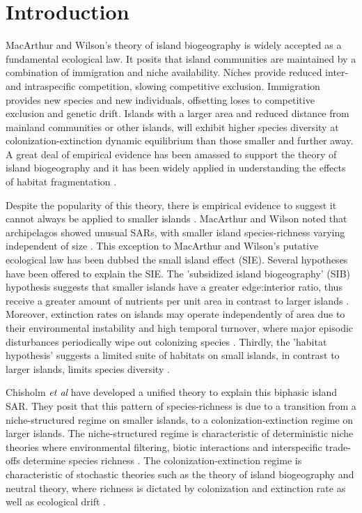 \chapter{Introduction}

MacArthur and Wilson's theory of island biogeography \cite{MacArthurRobertH1967Ttoi} is widely accepted as a fundamental ecological law. It posits that island communities are maintained by a combination of immigration and niche availability. Niches provide reduced inter- and intraspecific competition, slowing competitive exclusion. Immigration provides new species and new individuals, offsetting loses to competitive exclusion and genetic drift. Islands with a larger area and reduced distance from mainland communities or other islands, will exhibit higher species diversity at colonization-extinction dynamic equilibrium than those smaller and further away. A great deal of empirical evidence has been amassed to support the theory of island biogeography and it has been widely applied in understanding the effects of habitat fragmentation \cite{haila2002conceptual}. \

\indent Despite the popularity of this theory, there is empirical evidence to suggest it cannot always be applied to smaller islands \cite{triantis2006re}\cite{sfenthourakis2009habitat}. MacArthur and Wilson noted that archipelagos showed unusual SARs, with smaller island species-richness varying independent of size \cite{MacArthurRobertH1967Ttoi}. This exception to MacArthur and Wilson's putative ecological law has been dubbed the small island effect (SIE). Several hypotheses have been offered to explain the SIE. The 'subsidized island biogeography' (SIB) hypothesis suggests that smaller islands have a greater edge:interior ratio, thus receive a greater amount of nutrients per unit area in contrast to larger islands \cite{barrett2003small}\cite{anderson2001subsidized}. Moreover, extinction rates on islands may operate independently of area due to their environmental instability and high temporal turnover, where major episodic disturbances periodically wipe out colonizing species \cite{chisholm2016maintenance}. Thirdly, the 'habitat hypothesis' suggests a limited suite of habitats on small islands, in contrast to larger islands, limits species diversity \cite{triantis2008evolutionary}. \

\indent Chisholm \textit{et al} \cite{chisholm2016maintenance} have developed a unified theory to explain this biphasic island SAR. They posit that this pattern of species-richness is due to a transition from a niche-structured regime on smaller islands, to a colonization-extinction regime on larger islands. The niche-structured regime is characteristic of deterministic niche theories where environmental filtering, biotic interactions and interspecific trade-offs determine species richness \cite{chase2011disentangling}. The colonization-extinction regime is characteristic of stochastic theories such as the theory of island biogeography and neutral theory, where richness is dictated by colonization and extinction rate as well as ecological drift \cite{hubbell2001unified}.\

